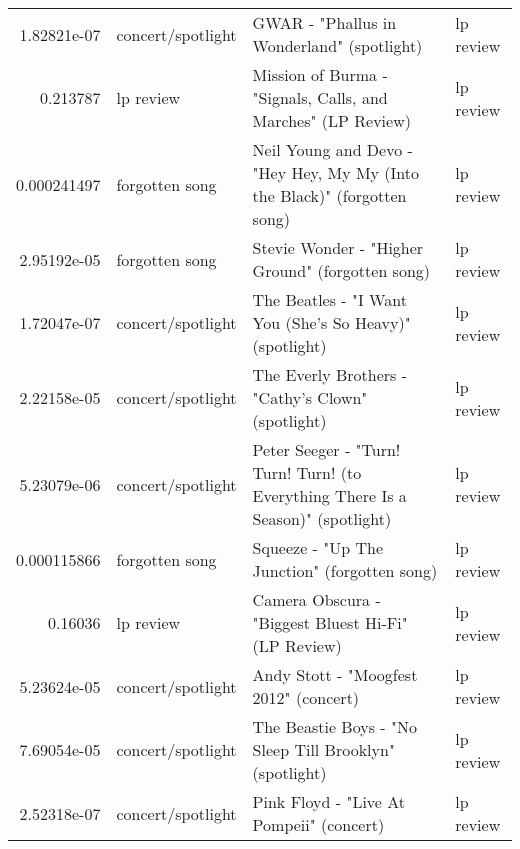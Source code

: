 \documentclass[letterpaper,10pt]{article}
\begin{document}
\begin{table}[H]
\begin{adjustbox}{max width=\linewidth}
\begin{tabular}{rlll}
  1.82821e-07 & concert/spotlight         & GWAR - "Phallus in Wonderland" (spotlight)                                                                   & lp review                 \\
  0.213787    & lp review                 & Mission of Burma - "Signals, Calls, and Marches" (LP Review)                                                 & lp review                 \\
  0.000241497 & forgotten song            & Neil Young and Devo - "Hey Hey, My My (Into the Black)" (forgotten song)                                     & lp review                 \\
  2.95192e-05 & forgotten song            & Stevie Wonder - "Higher Ground" (forgotten song)                                                             & lp review                 \\
  1.72047e-07 & concert/spotlight         & The Beatles - "I Want You (She's So Heavy)" (spotlight)                                                      & lp review                 \\
  2.22158e-05 & concert/spotlight         & The Everly Brothers - "Cathy's Clown" (spotlight)                                                            & lp review                 \\
  5.23079e-06 & concert/spotlight         & Peter Seeger - "Turn! Turn! Turn! (to Everything There Is a Season)" (spotlight)                             & lp review                 \\
  0.000115866 & forgotten song            & Squeeze - "Up The Junction" (forgotten song)                                                                 & lp review                 \\
  0.16036     & lp review                 & Camera Obscura - "Biggest Bluest Hi-Fi" (LP Review)                                                          & lp review                 \\
  5.23624e-05 & concert/spotlight         & Andy Stott - "Moogfest 2012" (concert)                                                                       & lp review                 \\
  7.69054e-05 & concert/spotlight         & The Beastie Boys - "No Sleep Till Brooklyn" (spotlight)                                                      & lp review                 \\
  2.52318e-07 & concert/spotlight         & Pink Floyd - "Live At Pompeii" (concert)                                                                     & lp review                 \\

\end{tabular}
\end{adjustbox}
\end{table}
\end{document}
